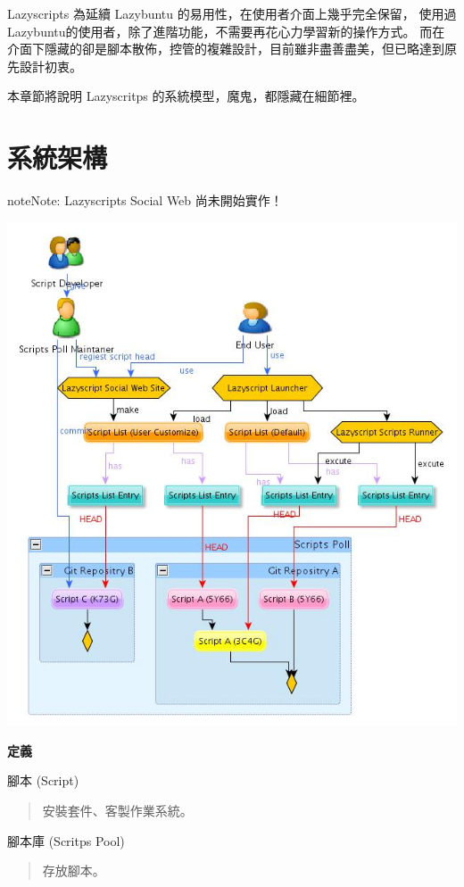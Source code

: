 \documentclass[letterpaper,10pt,english]{manual}
\begin{document}
Lazyscripts 為延續 Lazybuntu 的易用性，在使用者介面上幾乎完全保留，
使用過Lazybuntu的使用者，除了進階功能，不需要再花心力學習新的操作方式。
而在介面下隱藏的卻是腳本散佈，控管的複雜設計，目前雖非盡善盡美，但已略達到原先設計初衷。

本章節將說明 Lazyscritps 的系統模型，魔鬼，都隱藏在細節裡。


\section{系統架構}

\begin{notice}{note}{Note:}
Lazyscripts Social Web 尚未開始實作！
\end{notice}

\includegraphics{lazyscripts_model.jpg}

\textbf{定義}

腳本 (Script)
\begin{quote}

安裝套件、客製作業系統。
\end{quote}

腳本庫 (Scritps Pool)
\begin{quote}

存放腳本。
\end{quote}
\end{document}
